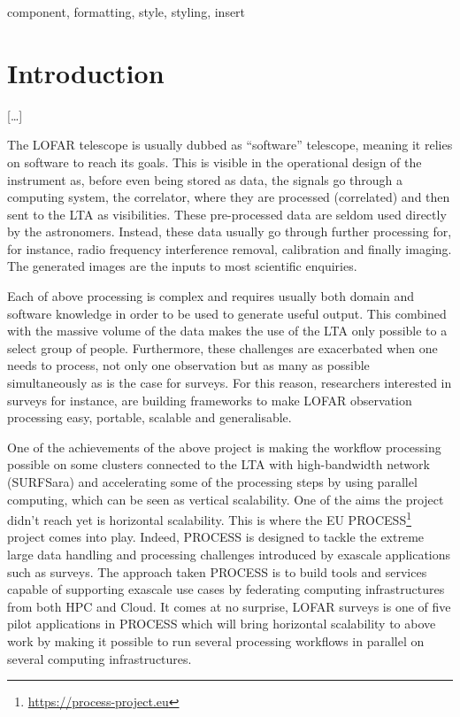 \documentclass[conference]{IEEEtran}
\begin{document}
\begin{IEEEkeywords}
component, formatting, style, styling, insert
\end{IEEEkeywords}

\section{Introduction}
[…]

The LOFAR telescope is usually dubbed as ``software'' telescope, meaning it relies on software to reach its goals. This is visible in the operational design of the instrument as, before even being stored as data, the signals go through a computing system, the correlator, where they are processed (correlated) and then sent to the LTA as visibilities. These pre-processed data are seldom used directly by the astronomers. Instead, these data usually go through further processing for, for instance, radio frequency interference removal, calibration and finally imaging. The generated images are the inputs to most scientific enquiries.

    Each of above processing is complex and requires usually both domain and software knowledge in order to be used to generate useful output. This combined with the massive volume of the data makes the use of the LTA only possible to a select group of people. Furthermore, these challenges are exacerbated when one needs to process, not only one observation but as many as possible simultaneously as is the case for surveys. For this reason, researchers interested in surveys for instance, are building frameworks to make LOFAR observation processing easy, portable, scalable and generalisable\cite{mechev2017}.

One of the achievements of the above project is making the workflow processing possible on some clusters connected to the LTA with high-bandwidth network (SURFSara) and accelerating some of the processing steps by using parallel computing, which can be seen as vertical scalability. One of the aims the project didn’t reach yet is horizontal scalability. This is where the EU PROCESS\footnote{\url{https://process-project.eu}} project comes into play. Indeed, PROCESS is designed to tackle the extreme large data handling and processing challenges introduced by exascale applications such as surveys. The approach taken PROCESS is to build tools and services capable of supporting exascale use cases by federating computing infrastructures from both HPC and Cloud. It comes at no surprise, LOFAR surveys is one of five pilot applications in PROCESS which will bring horizontal scalability to above work by making it possible to run several processing workflows in parallel on several computing infrastructures.
\end{document}
